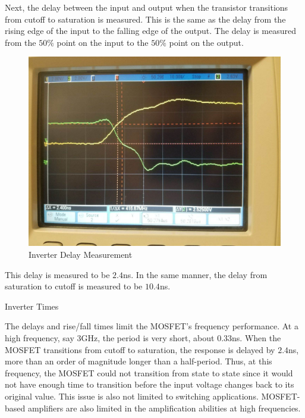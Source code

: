 Next, the delay between the input and output when the transistor transitions from cutoff to saturation is measured. This is the same as the delay from the rising edge of the input to the falling edge of the output. The delay is measured from the $50\%$ point on the input to the $50\%$ point on the output.

\FloatBarrier
\begin{figure}[h!]
	\centering
	\includegraphics[scale=0.25]{./images/inverter_input_rising_td.jpeg}
	\caption{Inverter Delay Measurement}
	\label{fig:inverter_time_delay}
\end{figure}
\FloatBarrier

This delay is measured to be $2.4$\si{\nano\second}. In the same manner, the delay from saturation to cutoff is measured to be $10.4$\si{\nano\second}.

\FloatBarrier
\begin{table}[h!]
	\centering
	\caption{Inverter Times}
	\label{tab:inverter_times}
\end{table}
\FloatBarrier

The delays and rise/fall times limit the MOSFET's frequency performance. At a high frequency, say $3$\si{\giga\hertz}, the period is very short, about $0.33$\si{\nano\second}. When the MOSFET transitions from cutoff to saturation, the response is delayed by $2.4$\si{\nano\second}, more than an order of magnitude longer than a half-period. Thus, at this frequency, the MOSFET could not transition from state to state since it would not have enough time to transition before the input voltage changes back to its original value. This issue is also not limited to switching applications. MOSFET-based amplifiers are also limited in the amplification abilities at high frequencies.
